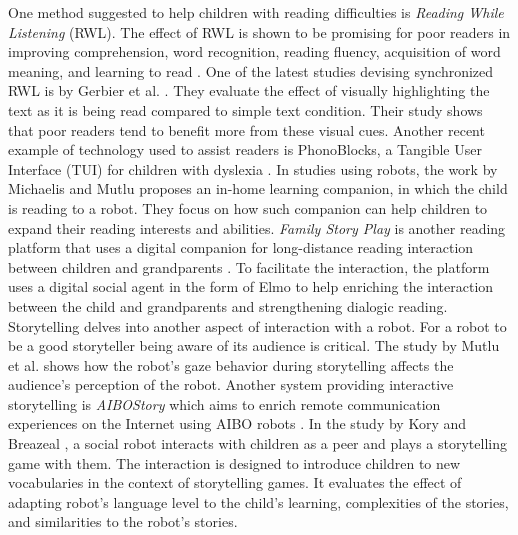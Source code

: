 \documentclass{sigchi}
\begin{document}
One method suggested to help children with reading difficulties is \textit{Reading While Listening} (RWL). 
The effect of RWL is shown to be promising for poor readers in improving comprehension, word recognition, reading fluency, acquisition of word meaning, and learning to read \cite{carbo1978teaching,chomsky1976after}. 
One of the latest studies devising synchronized RWL is by Gerbier et al. \cite{gerbier2018audio}. 
They evaluate the effect of visually highlighting the text as it is being read compared to simple text condition.
Their study shows that poor readers tend to benefit more from these visual cues.
Another recent example of technology used to assist readers is PhonoBlocks, a Tangible User Interface (TUI) for children with dyslexia \cite{fan2016design}.
In studies using robots, the work by Michaelis and Mutlu \cite{michaelis2017someone} proposes an in-home learning companion, in which the child is reading to a robot. 
They focus on how such companion can help children to expand their reading interests and abilities. 
\textit{Family Story Play} is another reading platform that uses a digital companion for long-distance reading interaction between children and grandparents \cite{raffle2010family}.  
To facilitate the interaction, the platform uses a digital social agent in the form of Elmo to help enriching the interaction between the child and grandparents and strengthening dialogic reading. 
Storytelling delves into another aspect of interaction with a robot. 
For a robot to be a good storyteller being aware of its audience is critical.
The study by Mutlu et al. \cite{mutlu2006storytelling} shows how the robot's gaze behavior during storytelling affects the audience's perception of the robot.
Another system providing interactive storytelling is \textit{AIBOStory} which aims to enrich remote communication experiences on the Internet using AIBO robots \cite{papadopoulos2013aibostory}.
In the study by Kory and Breazeal \cite{kory2014storytelling}, a social robot interacts with children as a peer and plays a storytelling game with them.
The interaction is designed to introduce children to new vocabularies in the context of storytelling games. 
It evaluates the effect of adapting robot's language level to the child's learning, complexities of the stories, and similarities to the robot's stories.
\end{document}
